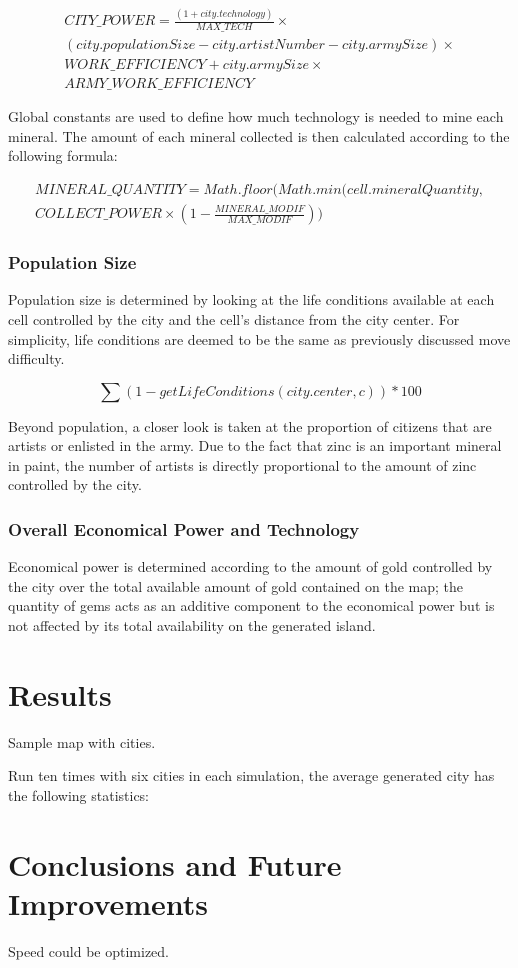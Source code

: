 \begin{equation}
\begin{split}
CITY\_POWER = \frac{(1+city.technology)}{MAX\_TECH} \times \\ (city.populationSize - city.artistNumber - city.armySize) \times \\ WORK\_EFFICIENCY + city.armySize \times \\ARMY\_WORK\_EFFICIENCY
\end{split}
\end{equation}

Global constants are used to define how much technology is needed to mine each mineral. The amount of each mineral collected is then calculated according to the following formula:

\begin{equation}
\begin{split}
MINERAL\_QUANTITY = Math.floor(Math.min(cell.mineralQuantity, \\ COLLECT\_POWER \times (1 - \frac{MINERAL\_MODIF}{MAX\_MODIF}))
\end{split}
\end{equation}
 
\subsubsection{Population Size}
Population size is determined by looking at the life conditions available at each cell controlled by the city and the cell's distance from the city center. For simplicity, life conditions are deemed to be the same as previously discussed move difficulty. 

\begin{equation}
\sum (1 - getLifeConditions(city.center, c)) * 100
\end{equation}

Beyond population, a closer look is taken at the proportion of citizens that are artists or enlisted in the army. Due to the fact that zinc is an important mineral in paint, the number of artists is directly proportional to the amount of zinc controlled by the city. 

\subsubsection{Overall Economical Power and Technology}
Economical power is determined according to the amount of gold controlled by the city over the total available amount of gold contained on the map; the quantity of gems acts as an additive component to the economical power but is not affected by its total availability on the generated island.

\section{Results}
Sample map with cities. 

Run ten times with six cities in each simulation, the average generated city has the following statistics:


\section{Conclusions and Future Improvements}

Speed could be optimized.



